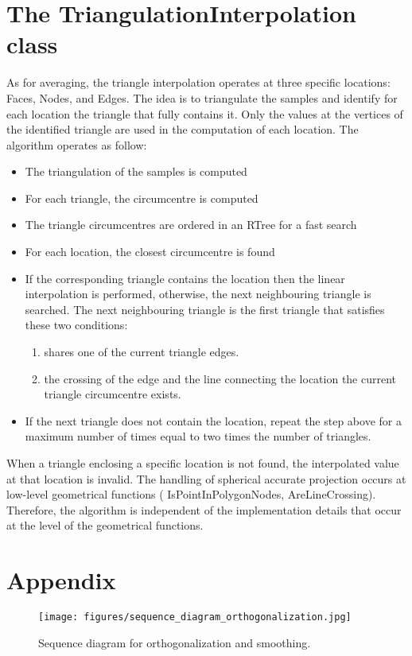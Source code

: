 \documentclass[biblatex]{deltares_manual}
\begin{document}
\chapter{The TriangulationInterpolation class}

As for averaging, the triangle interpolation operates at three specific locations: Faces, Nodes, and Edges. The idea is to triangulate the samples and identify for each location the triangle that fully contains it. Only the values at the vertices of the identified triangle are used in the computation of each location.
The algorithm operates as follow:
\begin{itemize}
	\item The triangulation of the samples is computed
	\item For each triangle, the circumcentre is computed
	\item The triangle circumcentres are ordered in an RTree for a fast search
	\item For each location, the closest circumcentre is found
	\item If the corresponding triangle contains the location then the linear interpolation is performed, otherwise, the next neighbouring triangle is searched. The next neighbouring triangle is the first triangle that satisfies these two conditions:
	\begin{enumerate}
		\item shares one of the current triangle edges.
		\item the crossing of the edge and the line connecting the location the current triangle circumcentre exists.
	\end{enumerate}
	\item If the next triangle does not contain the location, repeat the step above for a maximum number of times equal to two times the number of triangles.
\end{itemize}
When a triangle enclosing a specific location is not found, the interpolated value at that location is invalid. The handling of spherical accurate projection occurs at low-level geometrical functions ( IsPointInPolygonNodes, AreLineCrossing). Therefore, the algorithm is independent of the implementation details that occur at the level of the geometrical functions. 

\appendix
\chapter{Appendix}


\begin{figure}[H]
	\centering
	\texttt{[image: figures/sequence\_diagram\_orthogonalization.jpg]}
	\caption{Sequence diagram for orthogonalization and smoothing.}
\end{figure}


\LastPage
%
\end{document}
